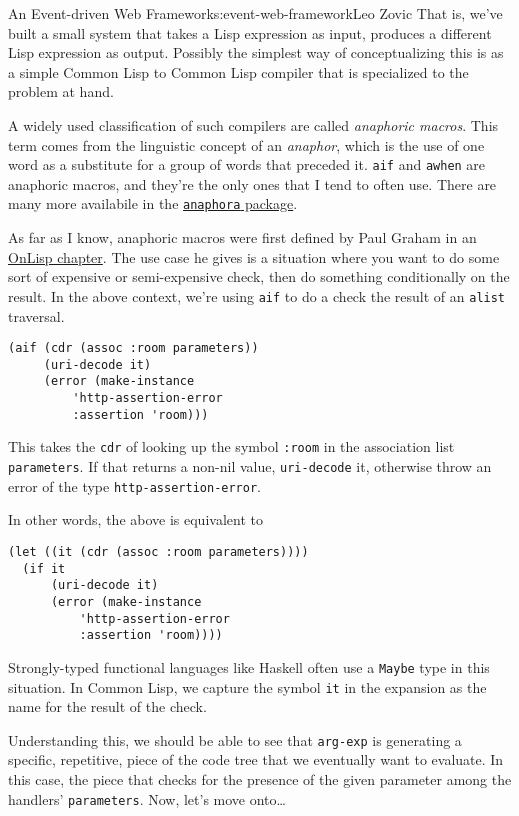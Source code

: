 \begin{aosachapter}{An Event-driven Web Framework}{s:event-web-framework}{Leo Zovic}
That is, we've built a small system that takes a Lisp expression as
input, produces a different Lisp expression as output. Possibly the
simplest way of conceptualizing this is as a simple Common Lisp to
Common Lisp compiler that is specialized to the problem at hand.

A widely used classification of such compilers are called
\emph{anaphoric macros}. This term comes from the linguistic concept of
an \emph{anaphor}, which is the use of one word as a substitute for a
group of words that preceded it. \texttt{aif} and \texttt{awhen} are
anaphoric macros, and they're the only ones that I tend to often use.
There are many more availabile in the
\href{http://www.cliki.net/Anaphora}{\texttt{anaphora} package}.

As far as I know, anaphoric macros were first defined by Paul Graham in
an \href{http://dunsmor.com/lisp/onlisp/onlisp_18.html}{OnLisp chapter}.
The use case he gives is a situation where you want to do some sort of
expensive or semi-expensive check, then do something conditionally on
the result. In the above context, we're using \texttt{aif} to do a check
the result of an \texttt{alist} traversal.

\begin{verbatim}
(aif (cdr (assoc :room parameters))
     (uri-decode it)
     (error (make-instance
         'http-assertion-error
         :assertion 'room)))
\end{verbatim}

This takes the \texttt{cdr} of looking up the symbol \texttt{:room} in
the association list \texttt{parameters}. If that returns a non-nil
value, \texttt{uri-decode} it, otherwise throw an error of the type
\texttt{http-assertion-error}.

In other words, the above is equivalent to

\begin{verbatim}
(let ((it (cdr (assoc :room parameters))))
  (if it
      (uri-decode it)
      (error (make-instance
          'http-assertion-error
          :assertion 'room))))
\end{verbatim}

Strongly-typed functional languages like Haskell often use a
\texttt{Maybe} type in this situation. In Common Lisp, we capture the
symbol \texttt{it} in the expansion as the name for the result of the
check.

Understanding this, we should be able to see that \texttt{arg-exp} is
generating a specific, repetitive, piece of the code tree that we
eventually want to evaluate. In this case, the piece that checks for the
presence of the given parameter among the handlers' \texttt{parameters}.
Now, let's move onto\ldots{}


\end{aosachapter}
